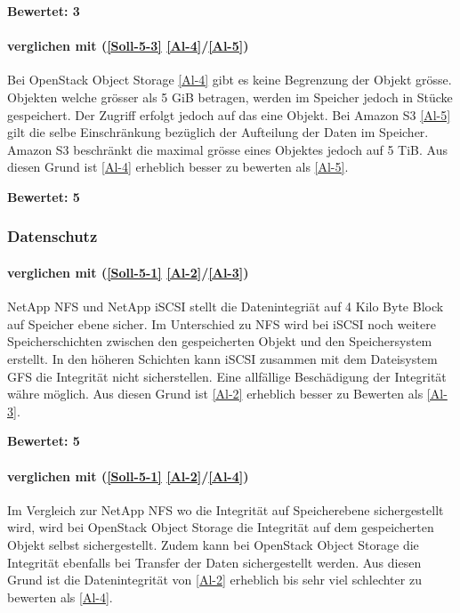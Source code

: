 \textbf{Bewertet: 3}


\paragraph*{  verglichen mit  (\ref{Soll-5-3} \ref{Al-4}/\ref{Al-5})}
Bei OpenStack Object Storage \ref{Al-4} gibt es keine Begrenzung der Objekt grösse. Objekten welche grösser als 5 GiB betragen, werden im Speicher jedoch in Stücke gespeichert. Der Zugriff erfolgt jedoch auf das eine Objekt. Bei Amazon S3 \ref{Al-5} gilt die selbe Einschränkung bezüglich der Aufteilung der Daten im Speicher. Amazon S3 beschränkt die maximal grösse eines Objektes jedoch auf 5 TiB. Aus diesen Grund ist \ref{Al-4} erheblich besser zu bewerten als \ref{Al-5}.

\textbf{Bewertet: 5}


\subsubsection{Datenschutz}

\paragraph*{  verglichen mit  (\ref{Soll-5-1} \ref{Al-2}/\ref{Al-3})}
NetApp NFS und NetApp iSCSI stellt die Datenintegriät auf 4 Kilo Byte Block auf Speicher ebene sicher. Im Unterschied zu NFS wird bei iSCSI noch weitere Speicherschichten zwischen den gespeicherten Objekt und den Speichersystem erstellt. In den höheren Schichten kann iSCSI zusammen mit dem Dateisystem GFS die Integrität nicht sicherstellen. Eine allfällige Beschädigung der Integrität währe möglich. Aus diesen Grund ist  \ref{Al-2} erheblich besser zu Bewerten als  \ref{Al-3}.

\textbf{Bewertet: 5}

\paragraph*{  verglichen mit  (\ref{Soll-5-1} \ref{Al-2}/\ref{Al-4})}
Im Vergleich zur NetApp NFS wo die Integrität auf Speicherebene sichergestellt wird, wird bei OpenStack Object Storage die Integrität auf dem gespeicherten Objekt selbst sichergestellt. Zudem kann bei OpenStack Object Storage die Integrität ebenfalls bei Transfer der Daten sichergestellt werden. Aus diesen Grund ist die Datenintegrität von  \ref{Al-2} erheblich bis sehr viel schlechter zu bewerten als  \ref{Al-4}.

